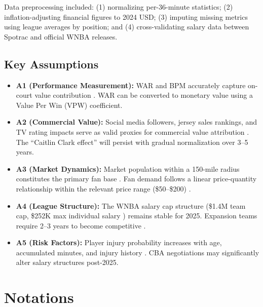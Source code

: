 \documentclass{mcmthesis}
\begin{document}
Data preprocessing included: (1) normalizing per-36-minute statistics; (2) inflation-adjusting financial figures to 2024 USD; (3) imputing missing metrics using league averages by position; and (4) cross-validating salary data between Spotrac and official WNBA releases.

\subsection{Key Assumptions}
\begin{itemize}
\item \textbf{A1 (Performance Measurement):} WAR and BPM accurately capture on-court value contribution \cite{kubatko2007, berri2006wages}. WAR can be converted to monetary value using a Value Per Win (VPW) coefficient.
\item \textbf{A2 (Commercial Value):} Social media followers, jersey sales rankings, and TV rating impacts serve as valid proxies for commercial value attribution \cite{humphreys2008}. The ``Caitlin Clark effect'' will persist with gradual normalization over 3--5 years.
\item \textbf{A3 (Market Dynamics):} Market population within a 150-mile radius constitutes the primary fan base \cite{huff1964}. Fan demand follows a linear price-quantity relationship within the relevant price range (\$50--\$200) \cite{krautmann2007}.
\item \textbf{A4 (League Structure):} The WNBA salary cap structure (\$1.4M team cap, \$252K max individual salary \cite{spotrac2024}) remains stable for 2025. Expansion teams require 2--3 years to become competitive \cite{fort2004}.
\item \textbf{A5 (Risk Factors):} Player injury probability increases with age, accumulated minutes, and injury history \cite{drakos2010}. CBA negotiations may significantly alter salary structures post-2025.
\end{itemize}


\section{Notations}  
\end{document}
